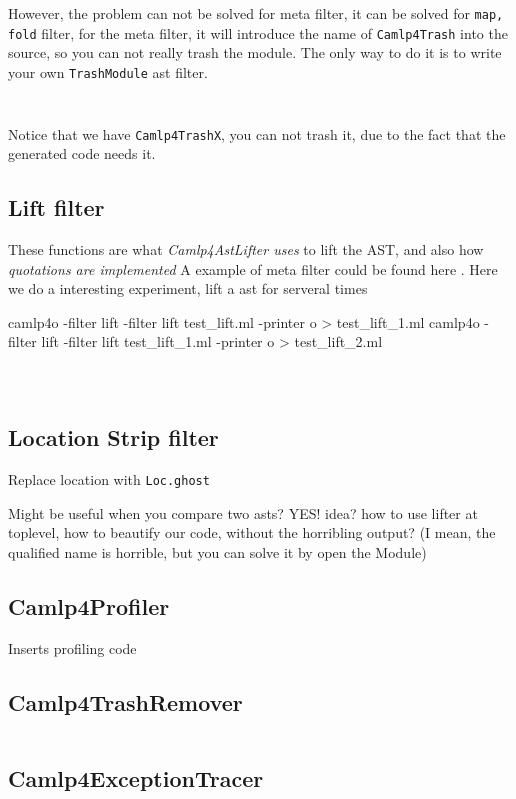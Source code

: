 However, the problem can not be solved for meta filter, it can be
solved for \verb|map, fold| filter, for the meta filter, it will
introduce the name of \verb|Camlp4Trash| into the source, so you can
not really trash the module. The only way to do it is to write your
own \verb|TrashModule| ast filter.

\inputminted[fontsize=\scriptsize, fontsize=\scriptsize]{ocaml}{camlp4/code/jake/json_ast.ml}
\inputminted[fontsize=\scriptsize, fontsize=\scriptsize]{ocaml}{camlp4/code/jake/pa_json_ast.ml}
Notice that we have \verb|Camlp4TrashX|, you can not trash it, due to
the fact that the generated code needs it.

\subsection{Lift filter}
These functions are what \emph{Camlp4AstLifter uses} to lift the AST,
and also how \emph{quotations are implemented }
A example of meta filter could be found here .
Here we do a interesting experiment, lift a ast for serveral times

\begin{bluetext}
camlp4o -filter lift -filter lift  test_lift.ml -printer o > test_lift_1.ml
camlp4o -filter lift -filter lift  test_lift_1.ml -printer o > test_lift_2.ml
\end{bluetext}

\inputminted[fontsize=\scriptsize, fontsize=\scriptsize]{ocaml}{camlp4/code/jake/test_lift.ml}
\inputminted[fontsize=\scriptsize, fontsize=\scriptsize]{ocaml}{camlp4/code/jake/test_lift_1.ml}
\inputminted[fontsize=\scriptsize, fontsize=\scriptsize]{ocaml}{camlp4/code/jake/test_lift_2.ml}


\subsection{Location Strip filter}
Replace location with \verb|Loc.ghost|


Might be useful when you compare two asts? YES!  idea? how to use
lifter at toplevel, how to beautify our code, without the horribling
output? (I mean, the qualified name is horrible, but you can solve it
by open the Module)

\subsection{Camlp4Profiler}
Inserts profiling code


\subsection{Camlp4TrashRemover}
\inputminted[fontsize=\scriptsize, fontsize=\scriptsize, lastline=40]{ocaml}{camlp4/code/jake/pa_trashmover.ml}

\subsection{Camlp4ExceptionTracer}



